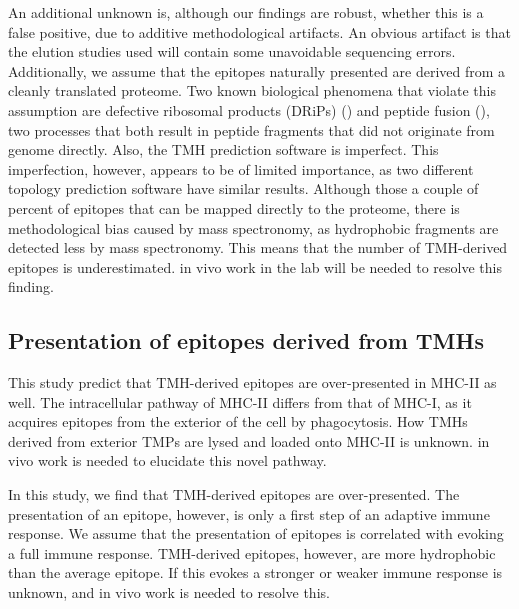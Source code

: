 An additional unknown is, although our findings are robust,
whether this is a false positive,
due to additive methodological artifacts.
An obvious artifact is that the elution studies used 
will contain some unavoidable sequencing errors.
Additionally, we assume that the epitopes naturally presented
are derived from a cleanly translated proteome.
Two known biological phenomena that violate this assumption
are defective ribosomal products (DRiPs) (\cite{yewdell1996defective}) 
and peptide fusion (\cite{delong2016pathogenic}),
two processes that both result in peptide fragments
that did not originate from genome directly.
Also, the TMH prediction software is imperfect.
This imperfection, however, appears to be of limited importance,
as two different topology prediction software have similar results.
Although those a couple of percent of epitopes that 
can be mapped directly to the proteome,
there is methodological bias caused by mass spectronomy,
as hydrophobic fragments are detected less 
by mass spectronomy. This means that the number of TMH-derived epitopes
is underestimated.
in vivo work in the lab will be needed to resolve this finding.

\subsection{Presentation of epitopes derived from TMHs}


This study predict that TMH-derived epitopes are over-presented
in MHC-II as well. 
The intracellular pathway of MHC-II differs from that of MHC-I,
as it acquires epitopes from the exterior of the cell by phagocytosis.
How TMHs derived from exterior TMPs are lysed and loaded onto MHC-II 
is unknown. in vivo work is needed to elucidate this novel pathway.


In this study, we find that TMH-derived epitopes are over-presented.
The presentation of an epitope, however, 
is only a first step of an adaptive immune response.
We assume that the presentation of epitopes is
correlated with evoking a full immune response.
TMH-derived epitopes, however, are more hydrophobic than the average
epitope. If this evokes a stronger or weaker immune response is unknown,
and in vivo work is needed to resolve this.

